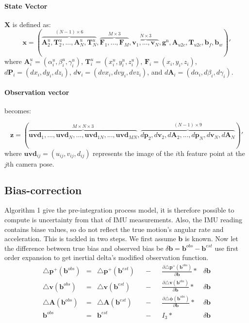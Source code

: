 \documentclass[12pt]{article}   %
\begin{document}
\paragraph{State Vector} $\textbf{X}$ is defined as:
$$\textbf{x} = (\overbrace{\textbf{A}^u_2, \textbf{T}^u_{2}, ... , \textbf{A}^u_{N}, \textbf{T}^u_{N}}^{(N - 1) \times 6}, \overbrace{\textbf{F}_{1}, ..., \textbf{F}_{M}}^{M \times 3}, \overbrace{\textbf{v}_1, ..., \textbf{v}_{N}}^{N \times 3},  \textbf{g}^{\mathrm{n}}, \textbf{A}_{u2c}, \textbf{T}_{u2c}, \textbf{b}_f, \textbf{b}_w)' $$
where
$\textbf{A}^u_i = (\alpha^u_i, \beta^u_i, \gamma^u_i)$,
$\textbf{T}^u_i = (x^u_i, y^u_i, z^u_i) $,
$\textbf{F}_{i} = (x_{i}, y_{i}, z_{i}) $,
$d\textbf{P}_{i} = (dx_{i}, dy_{i}, dz_{i}) $,
$d\textbf{v}_{i} = (dvx_{i}, dvy_{i}, dvz_{i}) $, and
$d\textbf{A}_{i} = (d\alpha_{i}, d\beta_{i}, d\gamma_{i}) $.

\paragraph{Observation vector} becomes:

$$\textbf{z} = (\overbrace{\textbf{uvd}_{1}, ... , \textbf{uvd}_{N}, ..., \textbf{uvd}_{1N}, ... , \textbf{uvd}_{MN}}^{M \times N \times 3}, \overbrace{d\textbf{p}_2, d\textbf{v}_2, d\textbf{A}_2, ..., d\textbf{p}_N, d\textbf{v}_N, d\textbf{A}_N}^{(N - 1) \times 9})' $$
where $\textbf{uvd}_{ij} = (u_{ij}, v_{ij}, d_{ij})$ represents the image of the $i$th feature point  at the $j$th camera pose.

\subsection{Bias-correction}
Algorithm 1 give the pre-integration process model, it is therefore possible to compute is uncertainty from that of IMU measurements. Also, the IMU reading contains biase values, so do not reflect the true motion's angular rate and acceleration. This is tackled in two steps. We first assume $\bm{b}$ is known. Now let the difference between true bias and observed bias be $\delta \bm{b} = \bm{b}^{obs} - \bm{b}^{est}$ use first order expansion to get inertial delta's modified observation function.
\begin{align*}
\triangle \bm{p}^+(\bm{b}^{obs}) &=& \triangle \bm{p}^+(\bm{b}^{est})& &- & &\frac{\partial {\triangle \bm{p}^+(\bm{b}^{obs})}}{\partial \bm{b}}  *&\delta \bm{b} \\
\triangle \bm{v}(\bm{b}^{obs}) &=& \triangle \bm{v}(\bm{b}^{est})& &- & & \frac{\partial {\triangle \bm{v}(\bm{b}^{obs})}}{\partial \bm{b}}*& \delta \bm{b} \\
\triangle \bm{A}(\bm{b}^{obs}) &=& \triangle \bm{A}(\bm{b}^{est})& &- & &\frac{\partial {\triangle \bm{\phi}(\bm{b}^{obs})}}{\partial \bm{b}}*& \delta \bm{b} \\
\bm{b}^{obs} &=& \bm{b}^{est}& &- & & I_3*&\delta \bm{b}
\end{align*}
\end{document}
